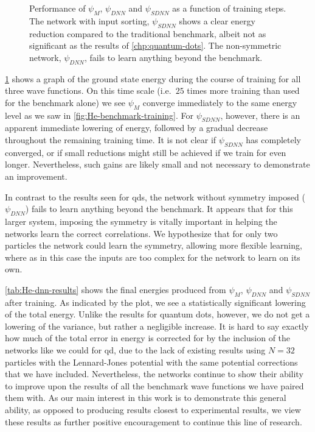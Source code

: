 \documentclass[Thesis.tex]{subfiles}
\begin{document}
\begin{figure}[h]
  \centering
  
  \caption[Learning progression of a neural network on liquid
  helium]{\label{fig:He-dnn-training}Performance of $\psi_M$, $\psi_{DNN}$ and $\psi_{SDNN}$
    as a function of training steps. The network with input sorting, $\psi_{SDNN}$ shows a clear energy reduction
    compared to the traditional benchmark, albeit not as significant as the
    results of \cref{chp:quantum-dots}. The non-symmetric network, $\psi_{DNN}$, fails
    to learn anything beyond the benchmark.}
\end{figure}

\cref{fig:He-dnn-training} shows a graph of the ground state energy during the
course of training for all three wave functions. On this time scale (i.e.\ $\num{25}$
times more training than used for the benchmark alone) we see $\psi_M$ converge
immediately to the same energy level as we saw in
\cref{fig:He-benchmark-training}. For $\psi_{SDNN}$, however, there is an
apparent immediate lowering of energy, followed by a gradual decrease throughout
the remaining training time. It is not clear if $\psi_{SDNN}$ has completely
converged, or if small reductions might still be achieved if we train for even
longer. Nevertheless, such gains are likely small and not necessary to
demonstrate an improvement.


In contrast to the results seen for \glspl{qd}, the network without symmetry
imposed ($\psi_{DNN}$) fails to learn anything beyond the benchmark. It appears
that for this larger system, imposing the symmetry is vitally important in
helping the networks learn the correct correlations. We hypothesize that for only two
particles the network could learn the symmetry, allowing more
flexible learning, where as in this case the inputs are too complex for the
network to learn on its own.


\cref{tab:He-dnn-results} shows the final energies produced from $\psi_{M}$,
$\psi_{DNN}$ and $\psi_{SDNN}$ after training. As indicated by the plot, we see
a statistically significant lowering of the total energy. Unlike the results for
quantum dots, however, we do not get a lowering of the variance, but rather a
negligible increase. It is hard to say exactly how much of the total error in energy
is corrected for by the inclusion of the networks like we could for \gls{qd}, due to the lack of existing
results using $N=32$ particles with the Lennard-Jones potential with the same
potential corrections that we have included. Nevertheless, the networks continue
to show their ability to improve upon the results of all the benchmark wave
functions we have paired them with. As our main interest in this work is to
demonstrate this general ability, as opposed to producing results closest to
experimental results, we view these results as further positive encouragement to
continue this line of research.
\end{document}
